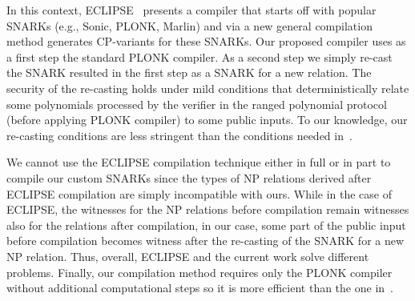 {\color{red}In this context, ECLIPSE~\cite{eclipse} presents a compiler that starts off with popular SNARKs (e.g., Sonic, PLONK, 
Marlin) and via a new general compilation method generates CP-variants for these SNARKs. 
Our proposed compiler uses as a first step the standard PLONK compiler.  As a second step we simply 
re-cast the SNARK resulted in the first step as a SNARK for a new relation. 
The security of the re-casting holds under mild conditions that deterministically relate some polynomials 
processed by the verifier in the ranged polynomial protocol (before applying PLONK compiler) to some 
public inputs. To our knowledge, our re-casting conditions are less stringent than the conditions needed 
in~\cite{eclipse}.}

{\color{red}We cannot use the ECLIPSE compilation technique either in full or in part to compile our custom SNARKs 
since the types of NP relations derived after ECLIPSE compilation are simply incompatible with ours. While in the 
case of ECLIPSE, the witnesses for the NP relations before compilation remain witnesses also for the relations 
after compilation, in our case, some part of the public input before compilation becomes witness after the 
re-casting of the SNARK for a new NP relation. Thus, overall, ECLIPSE and the current work solve different problems. 
Finally, our compilation method requires only the PLONK compiler without additional computational 
steps so it is more efficient than the one in~\cite{eclipse}.} 

